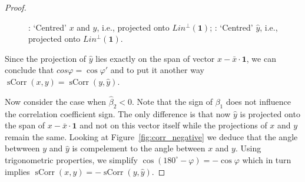 \documentclass[nobib]{tufte-handout}
\DeclareMathOperator{\sCorr}{sCorr}
\theoremstyle{definition}
\begin{document}
\begin{proof}
\begin{figure}[h!]
\begin{center}
\caption{: `Centred' $x$ and $y$, i.e., projected onto $Lin^{\perp}(\mathbf{1})$; : `Centred' $\hat y$, i.e., projected onto $Lin^{\perp}(\mathbf{1})$.}
\end{center}
\end{figure}

Since the projection of $\hat y$ lies exactly on the span of vector $x - \bar x \cdot \mathbf{1}$, we can conclude that $cos \varphi = \cos \varphi '$ and to put it another way $\sCorr(x,y) = \sCorr(y, \hat y)$.

Now consider the case when $\hat \beta_2 < 0$.
Note that the sign of $\beta_1$ does not influence the correlation coefficient sign.
The only difference is that now $\hat y$ is projected onto the span of  $x - \bar x \cdot \mathbf{1}$ and not on this vector itself while the projections of $x$ and $y$ remain the same.
Looking at Figure~\ref{fig:corr_negative} we deduce that the angle betwween $y$ and $\hat y$ is compelement to the angle between $x$ and $y$.
Using trigonometric properties, we simplify $\cos(180^{\circ} - \varphi) = -\cos\varphi$ which in turn implies $\sCorr(x,y) = -\sCorr(y,\hat y)$.


\end{proof}
\end{document}
